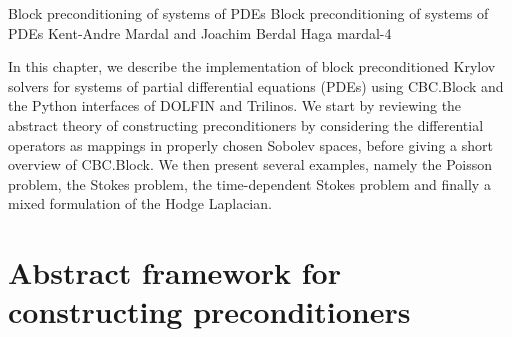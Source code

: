               {Block preconditioning of systems of PDEs}
              {Block preconditioning of systems of PDEs}
              {Kent-Andre Mardal and Joachim Berdal Haga}
              {mardal-4}

\newcommand{\algorithmexample}[3]{%
\begin{figure}
  \small
  \begin{tabular}{l}
    \toprule
    \textbf{Algorithm example #1:} #2 \\
    \midrule
    \begin{minipage}{0.9\textwidth}
      \vspace{0.1cm}
      \begin{enumerate}
        #3
      \end{enumerate}
      \vspace{0.1cm}
    \end{minipage} \\
    \bottomrule
  \end{tabular}
  \normalsize
\end{figure}}

In this chapter, we describe the implementation of block
preconditioned Krylov solvers for systems of partial differential
equations (PDEs) using CBC.Block and the
Python interfaces of DOLFIN and Trilinos. We start
by reviewing the abstract theory of constructing
preconditioners by considering the differential
operators as mappings in properly chosen Sobolev spaces, before giving
a short overview of CBC.Block. We then present several examples,
namely the Poisson problem, the Stokes problem, the time-dependent
Stokes problem and finally a mixed formulation of the Hodge Laplacian.

\section{Abstract framework for constructing preconditioners}

